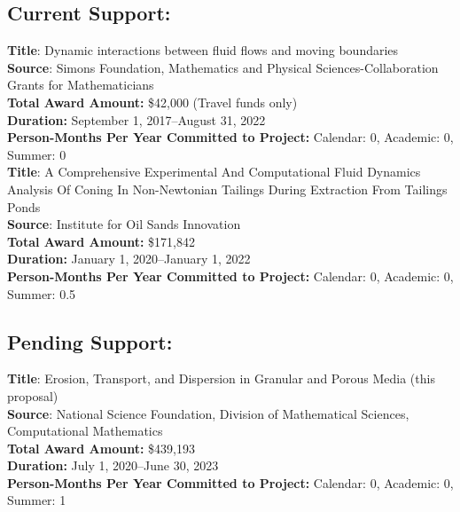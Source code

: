 \documentclass[11pt]{article}
\begin{document}
\subsection*{Current Support:}

{\bf Title}: Dynamic interactions between fluid flows and moving boundaries \\
{\bf Source}: Simons Foundation, Mathematics and Physical
Sciences-Collaboration Grants for Mathematicians \\
{\bf Total Award Amount:} \$42,000 (Travel funds only) \\
{\bf Duration:} September 1, 2017--August 31, 2022 \\
{\bf Person-Months Per Year Committed to Project:} Calendar: 0,
Academic: 0, Summer: 0 \\

\noindent
{\bf Title}:  A Comprehensive Experimental And Computational Fluid Dynamics Analysis Of Coning In Non-Newtonian Tailings During Extraction From Tailings Ponds \\
{\bf Source}:  Institute for Oil Sands Innovation\\
{\bf Total Award Amount:} \$171,842 \\
{\bf Duration:}  January 1, 2020--January 1, 2022\\
{\bf Person-Months Per Year Committed to Project:} Calendar: 0,
Academic: 0, Summer: 0.5 \\

\subsection*{Pending Support:}
{\bf Title}: Erosion, Transport, and Dispersion in Granular and Porous
Media (this proposal) \\
{\bf Source}: National Science Foundation, Division of Mathematical
Sciences, Computational Mathematics \\
{\bf Total Award Amount:} \$439,193 \\
{\bf Duration:} July 1, 2020--June 30, 2023 \\
{\bf Person-Months Per Year Committed to Project:} Calendar: 0,
Academic: 0, Summer: 1 \\
\end{document}
